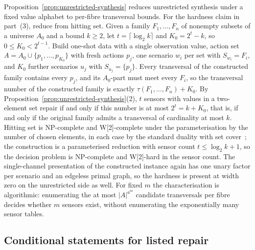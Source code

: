 \documentclass[11pt]{article}
\theoremstyle{plain}
\theoremstyle{definition}
\theoremstyle{remark}
\begin{document}
Proposition~\ref{prop:unrestricted-synthesis} reduces unrestricted synthesis
under a fixed value alphabet to per-fibre transversal bounds.  For the
hardness claim in part~(3), reduce from hitting set.  Given a family
\(F_1,\dots,F_n\) of nonempty subsets of a universe \(A_0\) and a bound
\(k\ge2\), let \(t=\lceil\log_2 k\rceil\) and \(K_0=2^t-k\), so
\(0\le K_0<2^{t-1}\).  Build one-shot data with a single observation value,
action set \(A=A_0\cup\{p_1,\dots,p_{K_0}\}\) with fresh actions \(p_j\),
one scenario \(w_i\) per set with \(S_{w_i}=F_i\), and \(K_0\) further
scenarios \(u_j\) with \(S_{u_j}=\{p_j\}\).  Every transversal of the
constructed family contains every \(p_j\), and its \(A_0\)-part must meet
every \(F_i\), so the transversal number of the constructed family is
exactly \(\tau(F_1,\dots,F_n)+K_0\).  By
Proposition~\ref{prop:unrestricted-synthesis}(2), \(t\) sensors with values
in a two-element set repair if and only if this number is at most
\(2^t=k+K_0\), that is, if and only if the original family admits a
transversal of cardinality at most \(k\).  Hitting set is NP-complete and
W[2]-complete under the parameterisation by the number of chosen elements,
in each case by the standard duality with set
cover~\cite{karp72,downey-fellows99}; the construction is a parameterised
reduction with sensor count \(t\le\log_2 k+1\), so the decision problem is
NP-complete and W[2]-hard in the sensor count.  The single-channel
presentation of the constructed instance again has one unary factor per
scenario and an edgeless primal graph, so the hardness is present at width
zero on the unrestricted side as well.  For fixed \(m\) the characterisation
is algorithmic: enumerating the at most \(|A|^{a^m}\) candidate transversals
per fibre decides whether \(m\) sensors exist, without enumerating the
exponentially many sensor tables.

\subsection{Conditional statements for listed repair}
\label{subsec:conditional-repair}
\end{document}
